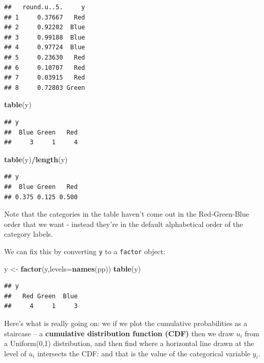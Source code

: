 \documentclass[
]{book}
\newenvironment{Shaded}{\begin{snugshade}}{\end{snugshade}}
\newcommand{\AttributeTok}[1]{\textcolor[rgb]{0.13,0.29,0.53}{#1}}
\newcommand{\FunctionTok}[1]{\textcolor[rgb]{0.13,0.29,0.53}{\textbf{#1}}}
\newcommand{\NormalTok}[1]{#1}
\newcommand{\OtherTok}[1]{\textcolor[rgb]{0.56,0.35,0.01}{#1}}
\newcommand{\SpecialCharTok}[1]{\textcolor[rgb]{0.81,0.36,0.00}{\textbf{#1}}}
\begin{document}
\begin{verbatim}
##   round.u..5.     y
## 1     0.37667   Red
## 2     0.92202  Blue
## 3     0.99188  Blue
## 4     0.97724  Blue
## 5     0.23630   Red
## 6     0.10707   Red
## 7     0.03915   Red
## 8     0.72803 Green
\end{verbatim}

\begin{Shaded}
\begin{Highlighting}[]
\FunctionTok{table}\NormalTok{(y)}
\end{Highlighting}
\end{Shaded}

\begin{verbatim}
## y
##  Blue Green   Red 
##     3     1     4
\end{verbatim}

\begin{Shaded}
\begin{Highlighting}[]
\FunctionTok{table}\NormalTok{(y)}\SpecialCharTok{/}\FunctionTok{length}\NormalTok{(y)}
\end{Highlighting}
\end{Shaded}

\begin{verbatim}
## y
##  Blue Green   Red 
## 0.375 0.125 0.500
\end{verbatim}

Note that the categories in the table haven't come out in the Red-Green-Blue order that we want -
instead they're in the default alphabetical order of the category labels.

We can fix this by converting \texttt{y} to a \texttt{factor} object:

\begin{Shaded}
\begin{Highlighting}[]
\NormalTok{y }\OtherTok{\textless{}{-}} \FunctionTok{factor}\NormalTok{(y,}\AttributeTok{levels=}\FunctionTok{names}\NormalTok{(pp))}
\FunctionTok{table}\NormalTok{(y)}
\end{Highlighting}
\end{Shaded}

\begin{verbatim}
## y
##   Red Green  Blue 
##     4     1     3
\end{verbatim}

Here's what is really going on: we if we plot the cumulative probabilities as
a staircase -- a \textbf{cumulative distribution function (CDF)} then
we draw \(u_i\) from a Uniform(0,1) distribution, and then find where
a horizontal line drawn at the level of \(u_i\) intersects the CDF: and that
is the value of the categorical variable \(y_i\).
\end{document}
